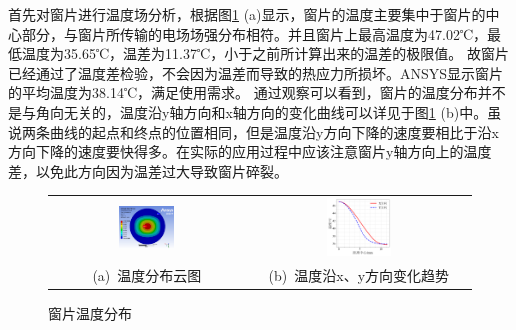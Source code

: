 \documentclass[master]{thesis-uestc}
\begin{document}
首先对窗片进行温度场分析，根据图\ref{fig:X输入温度场} (a)显示，窗片的温度主要集中于窗片的中心部分，与窗片所传输的电场场强分布相符。并且窗片上最高温度为47.02℃，最低温度为35.65℃，温差为11.37℃，小于之前所计算出来的温差的极限值。
故窗片已经通过了温度差检验，不会因为温差而导致的热应力所损坏。ANSYS显示窗片的平均温度为38.14℃，满足使用需求。
通过观察可以看到，窗片的温度分布并不是与角向无关的，温度沿y轴方向和x轴方向的变化曲线可以详见于图\ref{fig:X输入温度场} (b)中。虽说两条曲线的起点和终点的位置相同，但是温度沿y方向下降的速度要相比于沿x方向下降的速度要快得多。在实际的应用过程中应该注意窗片y轴方向上的温度差，以免此方向因为温差过大导致窗片碎裂。
\begin{figure}[!htb]
    \small
    \centering
    \begin{tabular}{@{\ }c@{\ }c}
        \includegraphics[width=0.3\textwidth]{pic/chapter3/X频段温度分布.png} & 
        \hspace{5pt}
        \includegraphics[width=0.3\textwidth]{pic/chapter3/窗片温度沿半径分布.png}     \\
        \mbox{\small (a) 温度分布云图}                                                                               & 
        \mbox{\small (b) 温度沿x、y方向变化趋势}                                                                                  \\
    \end{tabular}
    \caption{窗片温度分布}
    \label{fig:X输入温度场}
\end{figure}
\end{document}

